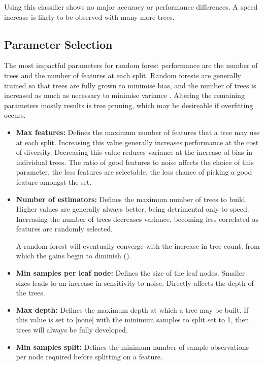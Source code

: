 Using this classifier shows no major accuracy or performance differences.
A speed increase is likely to be observed with many more trees.

\subsection{Parameter Selection}\label{sec:param}
The most impactful parameters for random forest performance are the number of
trees and the number of features at each split.
Random forests are generally trained so that trees are fully grown to minimise
bias, and the number of trees is increased as much as necessary to minimise
variance \parencite{breiman2001}.
Altering the remaining parameters mostly results is tree pruning, which may be
desireable if overfitting occurs.

\begin{itemize}
  \item \textbf{Max features:}
    Defines the maximum number of features that a tree may use at each split.
    Increasing this value generally increases performance at the cost of
    diversity.
    Decreasing this value reduces variance at the increase of bias in individual
    trees.
    The ratio of good features to noise affects the choice of this parameter,
    the less features are selectable, the less chance of picking a good feature
    amongst the set.

  \item \textbf{Number of estimators:}
    Defines the maximum number of trees to build.
    Higher values are generally always better, being detrimental only to speed.
    Increasing the number of trees decreases variance, becoming less
    correlated as features are randomly selected.

    A random forest will eventually converge with the increase in tree count,
    from which the gains begin to diminish (\textcite{breiman2001}).

  \item \textbf{Min samples per leaf node:}
    Defines the size of the leaf nodes.
    Smaller sizes leads to an increase in sensitivity to noise.
    Directly affects the depth of the trees.

  \item \textbf{Max depth:}
    Defines the maximum depth at which a tree may be built.
    If this value is set to |none| with the minimum samples to split set to 1,
    then trees will always be fully developed.

  \item \textbf{Min samples split:}
    Defines the minimum number of sample observations per node required before
    splitting on a feature.
\end{itemize}

